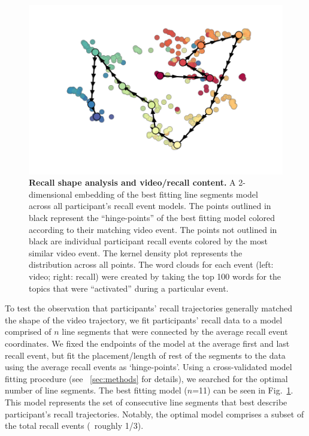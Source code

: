 \documentclass{article}
\begin{document}
{\begin{figure}[th!]
\centering
\includegraphics[width=1\textwidth]{figs/5_linesegs.pdf}
\caption{\small \textbf{Recall shape analysis and video/recall content.} A 2-dimensional embedding of the best fitting line segments model across all participant's recall event models.  The points outlined in black represent the ``hinge-points'' of the best fitting model colored according to their matching video event.  The points not outlined in black are individual participant recall events colored by the most similar video event. The kernel density plot represents the distribution across all points.  The word clouds for each event (left: video; right: recall) were created by taking the top 100 words for the topics that were ``activated'' during a particular event.}
\label{fig:linesegs}
\end{figure}

To test the observation that participants' recall trajectories generally matched the shape of the video trajectory, we fit participants' recall data to a model comprised of $n$ line segments that were connected by the average recall event coordinates. We fixed the endpoints of the model at the average first and last recall event, but fit the placement/length of rest of the segments to the data using the average recall events as `hinge-points'. Using a cross-validated model fitting procedure (see ~\ref{sec:methods} for details), we searched for the optimal number of line segments. The best fitting model ($n$=11) can be seen in Fig.~\ref{fig:linesegs}. This model represents the set of consecutive line segments that best describe participant's recall trajectories. Notably, the optimal model comprises a subset of the total recall events (~roughly 1/3). %

}
\end{document}

